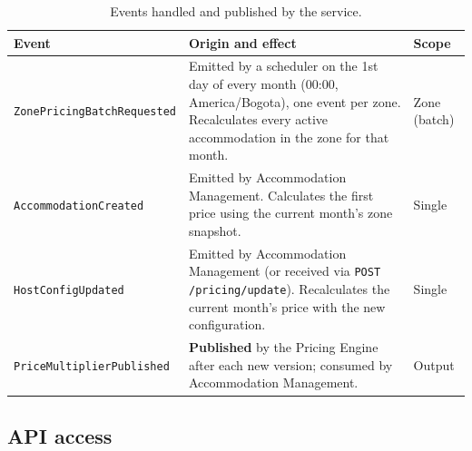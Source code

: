 \documentclass[11pt,a4paper]{article}
\begin{document}
\begin{table}[H]
  \centering
  \begin{tabularx}{\textwidth}{@{}lXl@{}}
    \toprule
    \textbf{Event} & \textbf{Origin and effect} & \textbf{Scope} \\
    \midrule
    \texttt{ZonePricingBatchRequested} & Emitted by a scheduler on the
      1st day of every month (00:00, America/Bogota), one event per zone.
      Recalculates every active accommodation in the zone for that month. & Zone (batch) \\
    \texttt{AccommodationCreated} & Emitted by Accommodation Management.
      Calculates the first price using the current month's zone snapshot. & Single \\
    \texttt{HostConfigUpdated} & Emitted by Accommodation Management (or
      received via \texttt{POST /pricing/update}). Recalculates the current
      month's price with the new configuration. & Single \\
    \texttt{PriceMultiplierPublished} & \textbf{Published} by the Pricing
      Engine after each new version; consumed by Accommodation Management. & Output \\
    \bottomrule
  \end{tabularx}
  \caption{Events handled and published by the service.}
\end{table}

\subsection{API access}
\end{document}
